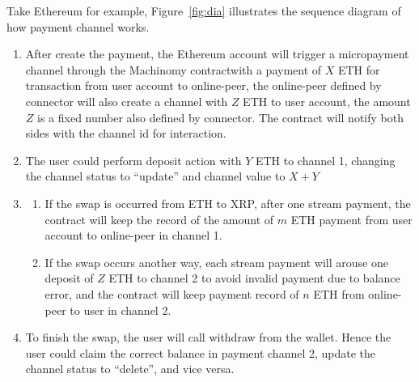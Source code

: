 \noindent Take Ethereum for example, Figure~\ref{fig:dia} illustrates the sequence diagram of how payment channel works.
\begin{enumerate}
    \item After create the payment, the Ethereum account will trigger a micropayment channel through the Machinomy contract\footnotemark[1] with a payment of $X$ ETH for transaction from user account to online-peer, the online-peer defined by connector will also create a channel with $Z$ ETH to user account, the amount $Z$ is a fixed number also defined by connector. The contract will notify both sides with the channel id for interaction.
    \item The user could perform deposit action with $Y$ ETH to channel 1, changing the channel status to ``update'' and channel value to $X+Y$
    \item \begin{enumerate}
    \item If the swap is occurred from ETH to XRP, after one stream payment, the contract will keep the record of the amount of $m$ ETH payment from user account to online-peer in channel 1.
    \item If the swap occurs another way, each stream payment will arouse one deposit of $Z$ ETH to channel 2 to avoid invalid payment due to balance error, and the contract will keep payment record of $n$ ETH from online-peer to user in channel 2.
     \end{enumerate}
     \item To finish the swap, the user will call withdraw from the wallet. Hence the user could claim the correct balance in payment channel 2, update the channel status to ``delete'', and vice versa.
\end{enumerate}
